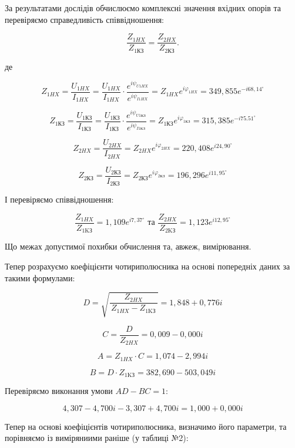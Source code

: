\documentclass[12pt,a4paper]{article}
\begin{document}
    \newpage

    За результатами дослідів обчислюємо комплексні значення вхідних опорів та перевіряємо справедливість співвідношення:

    \[
    \boxed{
    \frac{Z_{1HX}}{Z_\text{1КЗ}} = \frac{Z_{2HX}}{Z_\text{2КЗ}}
    }.
    \]

    де 

    \[
    Z_{1HX} = \frac{U_{1HX}}{I_{1HX}} = \frac{U_{1HX}}{I_{1HX}} \cdot 
    \frac{e^{i\psi_{U1HX}}}{e^{i\psi_{I1HX}}} = Z_{1HX} e^{i\varphi_{1HX}}
    = 349{,}855e^{-i68{,}14^\circ}
    \]

    \[
    Z_{\text{1КЗ}} = \frac{U_{\text{1КЗ}}}{I_{\text{1КЗ}}} = \frac{U_{\text{1КЗ}}}{I_{\text{1КЗ}}} \cdot 
    \frac{e^{i\psi_{U1\text{КЗ}}}}{e^{i\psi_{I1\text{КЗ}}}} = Z_{\text{1КЗ}} e^{i\varphi_{\text{1КЗ}}}
    = 315{,}385e^{-i75.51^\circ}
    \]

    \[
    Z_{2HX} = \frac{U_{2HX}}{I_{2HX}} = Z_{2HX} e^{i\varphi_{2HX}}
    = 220{,}408e^{i24{,}90^\circ}
    \]

    \[
    Z_{\text{2КЗ}} = \frac{U_{\text{2КЗ}}}{I_{\text{2КЗ}}} = Z_{\text{2КЗ}} e^{i\varphi_{\text{2КЗ}}}
    = 196{,}296e^{i11{,}95^\circ}
    \]

    І перевіряємо співвідношення:

    \[
    \frac{Z_{1HX}}{Z_{\text{1KЗ}}} = 1{,}109e^{i7{,}37^\circ} \text{ та }
    \frac{Z_{2HX}}{Z_{\text{2KЗ}}} = 1{,}123e^{i12{,}95^\circ}
    \]

    Що межах допустимої похибки обчислення та, авжеж, вимірювання.

    Тепер розрахуємо коефіцієнти чотириполюсника на основі попередніх даних за такими формулами:

    \[
    D = \sqrt{\frac{Z_{2HX}}{\,Z_{1HX}-Z_{1\text{KЗ}}\,}}
    = 1{,}848+0{,}776i
    \]

    \[
    C = \frac{D}{Z_{2HX}}
    = 0{,}009-0{,}000i
    \]

    \[
    A = Z_{1HX} \cdot C
    = 1{,}074-2{,}994i
    \]

    \[
    B = D \cdot Z_{\text{1KЗ}} = 
    382{,}690-503{,}049i
    \]

    Перевіряємо виконання умови $AD - BC = 1$:

    \[
    4{,}307-4{,}700i - 3{,}307+4{,}700i = 1{,}000+0{,}000i
    \]

    Тепер на основі коефіцієнтів чотириполюсника, визначимо його параметри, та порівняємо із виміряниими раніше (у таблиці №2):
\end{document}
